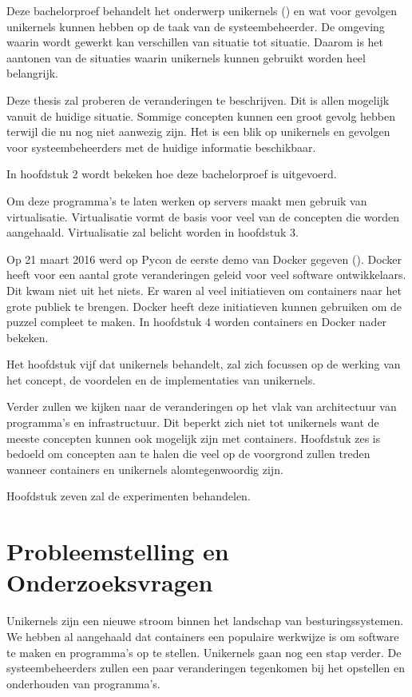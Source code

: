 \documentclass[pdftex,a4paper,12pt,twoside]{report}
\begin{document}
Deze bachelorproef behandelt het onderwerp unikernels (\cite{mao_performance_2012}) en wat voor gevolgen unikernels kunnen hebben op de taak van de systeembeheerder. De omgeving waarin wordt gewerkt kan verschillen van situatie tot situatie. Daarom is het aantonen van de situaties waarin unikernels kunnen gebruikt worden heel belangrijk.

Deze thesis zal proberen de veranderingen te beschrijven. Dit is allen mogelijk vanuit de huidige situatie. Sommige concepten kunnen een groot gevolg hebben terwijl die nu nog niet aanwezig zijn. Het is een blik op unikernels en gevolgen voor systeembeheerders met de huidige informatie beschikbaar.

In hoofdstuk 2 wordt bekeken hoe deze bachelorproef is uitgevoerd.

Om deze programma's te laten werken op servers maakt men gebruik van virtualisatie. Virtualisatie vormt de basis voor veel van de concepten die worden aangehaald. Virtualisatie zal belicht worden in hoofdstuk 3.

Op 21 maart 2016 werd op Pycon de eerste demo van Docker gegeven (\cite{hykes_future_2013}). Docker heeft voor een aantal grote veranderingen geleid voor veel software ontwikkelaars. Dit kwam niet uit het niets. Er waren al veel initiatieven om containers naar het grote publiek te brengen. Docker heeft deze initiatieven kunnen gebruiken om de puzzel compleet te maken. In hoofdstuk 4 worden containers en Docker nader bekeken.

Het hoofdstuk vijf dat unikernels behandelt, zal zich focussen op de werking van het concept, de voordelen en de implementaties van unikernels.

Verder zullen we kijken naar de veranderingen op het vlak van architectuur van programma's en infrastructuur. Dit beperkt zich niet tot unikernels want de meeste concepten kunnen ook mogelijk zijn met containers. Hoofdstuk zes is bedoeld om concepten aan te halen die veel op de voorgrond zullen treden wanneer containers en unikernels alomtegenwoordig zijn.

Hoofdstuk zeven zal de experimenten behandelen.

\section{Probleemstelling en Onderzoeksvragen}
\label{sec:onderzoeksvragen}

Unikernels zijn een nieuwe stroom binnen het landschap van besturingssystemen. We hebben al aangehaald dat containers een populaire werkwijze is om software te maken en programma's op te stellen. Unikernels gaan nog een stap verder. De systeembeheerders zullen een paar veranderingen tegenkomen bij het opstellen en onderhouden van programma's.
\end{document}
